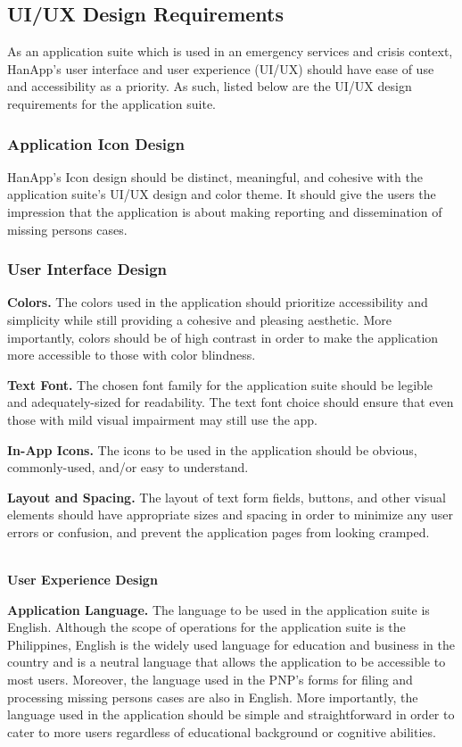 \subsection{UI/UX Design Requirements}

As an application suite which is used in an emergency services and crisis context, HanApp's user interface and user experience (UI/UX) should have ease of use and accessibility as a priority. As such, listed below are the UI/UX  design requirements for the application suite.

\subsubsection{Application Icon Design}

HanApp's Icon design should be distinct, meaningful, and cohesive with the application suite's UI/UX design and color theme. It should give the users the impression that the application is about making reporting and dissemination of missing persons cases.

\subsubsection{User Interface Design}

\textbf{Colors.} The colors used in the application should prioritize accessibility and simplicity while still providing a cohesive and pleasing aesthetic. More importantly, colors should be of high contrast in order to make the application more accessible to those with color blindness.

\textbf{Text Font.} The chosen font family for the application suite should be legible and adequately-sized for readability. The text font choice should ensure that even those with mild visual impairment may still use the app.

\textbf{In-App Icons.} The icons to be used in the application should be obvious, commonly-used, and/or easy to understand.

\textbf{Layout and Spacing.} The layout of text form fields, buttons, and other visual elements should have appropriate sizes and spacing in order to minimize any user errors or confusion, and prevent the application pages from looking cramped.  

\hfill\\
\textbf{User Experience Design}

\textbf{Application Language.} The language to be used in the application suite is English. Although the scope of operations for the application suite is the Philippines, English is the widely used language for education and business in the country and is a neutral language that allows the application to be accessible to most users. Moreover, the language used in the PNP's forms for filing and processing missing persons cases are also in English. More importantly, the language used in the application should be simple and straightforward in order to cater to more users regardless of educational background or cognitive abilities.

